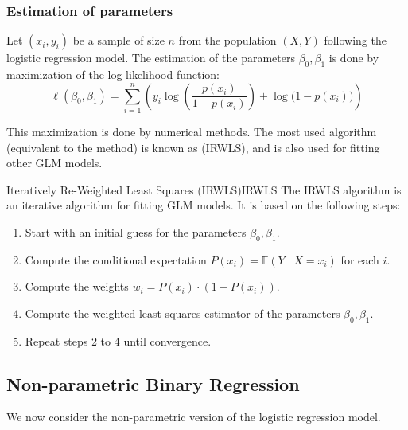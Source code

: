 \subsubsection{Estimation of parameters}
Let $(x_i, y_i)$ be a sample of size $n$ from the population $(X, Y)$ following
the logistic regression model. The estimation of the parameters $\beta_0, \beta_1$
is done by maximization of the log-likelihood function:
\begin{equation*}
    \ell(\beta_0, \beta_1) = \sum_{i=1}^n \left(y_i \log \left( \frac{p(x_i)}{1 - p(x_i)} \right) + \log\bigl(1 - p(x_i)\bigr) \right)
\end{equation*}

This maximization is done by numerical methods. The most used algorithm
(equivalent to the  method)
is known as  (IRWLS), and
is also used for fitting other GLM models.

\begin{definition}{Iteratively Re-Weighted Least Squares (IRWLS)}{IRWLS}
    The IRWLS algorithm is an iterative algorithm for fitting GLM models.
    It is based on the following steps:
    \begin{enumerate}
        \item Start with an initial guess for the parameters $\beta_0, \beta_1$.
        \item Compute the conditional expectation $P(x_i) = \mathds{E}(Y \mid X = x_i)$
            for each $i$.
        \item Compute the weights $w_i = P(x_i) \cdot (1 - P(x_i))$.
        \item Compute the weighted least squares estimator of the parameters
            $\beta_0, \beta_1$.
        \item Repeat steps 2 to 4 until convergence.
    \end{enumerate}
\end{definition}

\subsection{Non-parametric Binary Regression}
We now consider the non-parametric version of the logistic regression model.

